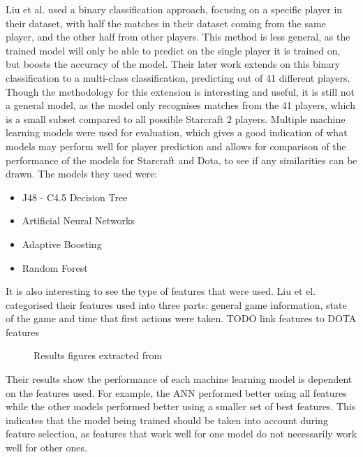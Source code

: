 \documentclass[Report.tex]{subfiles}
\begin{document}
Liu et al. used a binary classification approach, focusing on a specific player in their dataset, with half the matches in their dataset coming from the same player, and the other half from other players. This method is less general, as the trained model will only be able to predict on the single player it is trained on, but boosts the accuracy of the model. Their later work \cite{starcraft-actions} extends on this binary classification to a multi-class classification, predicting out of 41 different players. Though the methodology for this extension is interesting and useful, it is still not a general model, as the model only recognises matches from the 41 players, which is a small subset compared to all possible Starcraft 2 players. Multiple machine learning models were used for evaluation, which gives a good indication of what models may perform well for player prediction and allows for comparison of the performance of the models for Starcraft and Dota, to see if any similarities can be drawn. The models they used were:
\begin{itemize}
\item J48 - C4.5 Decision Tree
\item Artificial Neural Networks
\item Adaptive Boosting
\item Random Forest
\end{itemize}
It is also interesting to see the type of features that were used. Liu et el. categorised their features used into three parts: general game information, state of the game and time that first actions were taken. TODO link features to DOTA features

\begin{figure}[H]
\centering
\begin{subfigure}{0.45\textwidth}
\end{subfigure}
\hspace{\fill}
\begin{subfigure}{0.45\textwidth}
\end{subfigure}
\caption{Results figures extracted from \cite{starcraft-identification}}
\end{figure}

Their results show the performance of each machine learning model is dependent on the features used. For example, the ANN performed better using all features while the other models performed better using a smaller set of best features. This indicates that the model being trained should be taken into account during feature selection, as features that work well for one model do not necessarily work well for other ones. 
\end{document}

